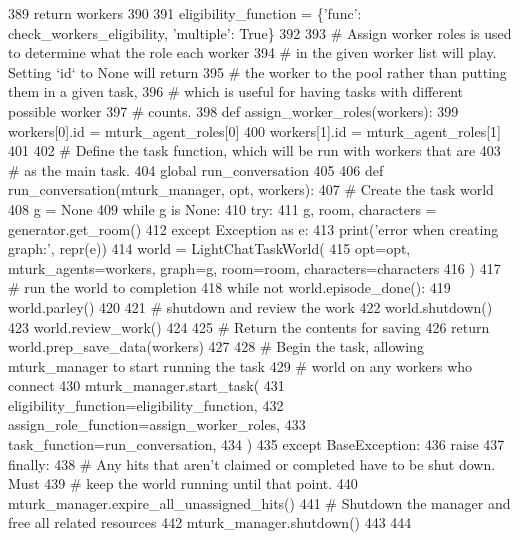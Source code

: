 \begin{DoxyCode}
389             \textcolor{keywordflow}{return} workers
390 
391         eligibility\_function = \{\textcolor{stringliteral}{'func'}: check\_workers\_eligibility, \textcolor{stringliteral}{'multiple'}: \textcolor{keyword}{True}\}
392 
393         \textcolor{comment}{# Assign worker roles is used to determine what the role each worker}
394         \textcolor{comment}{# in the given worker list will play. Setting `id` to None will return}
395         \textcolor{comment}{# the worker to the pool rather than putting them in a given task,}
396         \textcolor{comment}{# which is useful for having tasks with different possible worker}
397         \textcolor{comment}{# counts.}
398         \textcolor{keyword}{def }assign\_worker\_roles(workers):
399             workers[0].id = mturk\_agent\_roles[0]
400             workers[1].id = mturk\_agent\_roles[1]
401 
402         \textcolor{comment}{# Define the task function, which will be run with workers that are}
403         \textcolor{comment}{# as the main task.}
404         \textcolor{keyword}{global} run\_conversation
405 
406         \textcolor{keyword}{def }run\_conversation(mturk\_manager, opt, workers):
407             \textcolor{comment}{# Create the task world}
408             g = \textcolor{keywordtype}{None}
409             \textcolor{keywordflow}{while} g \textcolor{keywordflow}{is} \textcolor{keywordtype}{None}:
410                 \textcolor{keywordflow}{try}:
411                     g, room, characters = generator.get\_room()
412                 \textcolor{keywordflow}{except} Exception \textcolor{keyword}{as} e:
413                     print(\textcolor{stringliteral}{'error when creating graph:'}, repr(e))
414             world = LightChatTaskWorld(
415                 opt=opt, mturk\_agents=workers, graph=g, room=room, characters=characters
416             )
417             \textcolor{comment}{# run the world to completion}
418             \textcolor{keywordflow}{while} \textcolor{keywordflow}{not} world.episode\_done():
419                 world.parley()
420 
421             \textcolor{comment}{# shutdown and review the work}
422             world.shutdown()
423             world.review\_work()
424 
425             \textcolor{comment}{# Return the contents for saving}
426             \textcolor{keywordflow}{return} world.prep\_save\_data(workers)
427 
428         \textcolor{comment}{# Begin the task, allowing mturk\_manager to start running the task}
429         \textcolor{comment}{# world on any workers who connect}
430         mturk\_manager.start\_task(
431             eligibility\_function=eligibility\_function,
432             assign\_role\_function=assign\_worker\_roles,
433             task\_function=run\_conversation,
434         )
435     \textcolor{keywordflow}{except} BaseException:
436         \textcolor{keywordflow}{raise}
437     \textcolor{keywordflow}{finally}:
438         \textcolor{comment}{# Any hits that aren't claimed or completed have to be shut down. Must}
439         \textcolor{comment}{# keep the world running until that point.}
440         mturk\_manager.expire\_all\_unassigned\_hits()
441         \textcolor{comment}{# Shutdown the manager and free all related resources}
442         mturk\_manager.shutdown()
443 
444 
\end{DoxyCode}
